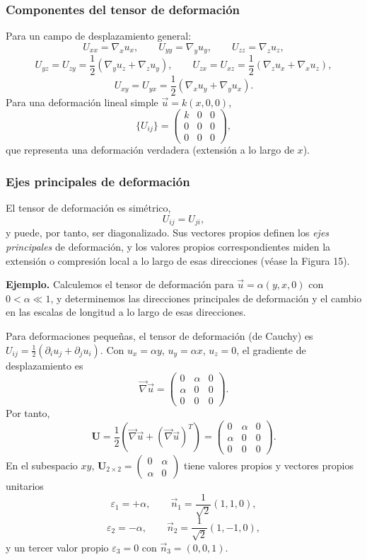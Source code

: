\subsubsection{Componentes del tensor de deformación}

Para un campo de desplazamiento general:
\[ U_{xx} = \nabla_x u_x, \qquad U_{yy} = \nabla_y u_y, \qquad U_{zz} = \nabla_z u_z, \]
\[ U_{yz} = U_{zy} = \frac{1}{2}\left(\nabla_y u_z + \nabla_z u_y\right), \qquad U_{zx} = U_{xz} = \frac{1}{2}\left(\nabla_z u_x + \nabla_x u_z\right), \]
\[ U_{xy} = U_{yx} = \frac{1}{2}\left(\nabla_x u_y + \nabla_y u_x\right). \]
Para una deformación lineal simple $\vec{u} = k(x, 0, 0)$,
\[ \{U_{ij}\} = \begin{pmatrix} k & 0 & 0 \\ 0 & 0 & 0 \\ 0 & 0 & 0 \end{pmatrix}, \]
que representa una deformación verdadera (extensión a lo largo de $x$).

\subsubsection{Ejes principales de deformación}

El tensor de deformación es simétrico,
\[ U_{ij} = U_{ji}, \]
y puede, por tanto, ser diagonalizado. Sus vectores propios definen los \emph{ejes principales} de deformación, y los valores propios correspondientes miden la extensión o compresión local a lo largo de esas direcciones (véase la Figura 15).

\textbf{Ejemplo.} Calculemos el tensor de deformación para $\vec{u} = \alpha(y, x, 0)$ con $0 < \alpha \ll 1$, y determinemos las direcciones principales de deformación y el cambio en las escalas de longitud a lo largo de esas direcciones.

Para deformaciones pequeñas, el tensor de deformación (de Cauchy) es $U_{ij} = \frac{1}{2}(\partial_i u_j + \partial_j u_i)$. Con $u_x = \alpha y$, $u_y = \alpha x$, $u_z = 0$, el gradiente de desplazamiento es
\[ \vec{\nabla}\vec{u} = \begin{pmatrix} 0 & \alpha & 0 \\ \alpha & 0 & 0 \\ 0 & 0 & 0 \end{pmatrix}. \]
Por tanto,
\[ \mathbf{U} = \frac{1}{2}\left(\vec{\nabla}\vec{u} + (\vec{\nabla}\vec{u})^{T}\right) = \begin{pmatrix} 0 & \alpha & 0 \\ \alpha & 0 & 0 \\ 0 & 0 & 0 \end{pmatrix}. \]
En el subespacio $xy$, $\mathbf{U}_{2\times 2} = \begin{pmatrix} 0 & \alpha \\ \alpha & 0 \end{pmatrix}$ tiene valores propios y vectores propios unitarios
\[ \varepsilon_1 = +\alpha, \qquad \vec{n}_1 = \frac{1}{\sqrt{2}}(1, 1, 0), \]
\[ \varepsilon_2 = -\alpha, \qquad \vec{n}_2 = \frac{1}{\sqrt{2}}(1, -1, 0), \]
y un tercer valor propio $\varepsilon_3 = 0$ con $\vec{n}_3 = (0, 0, 1)$.

